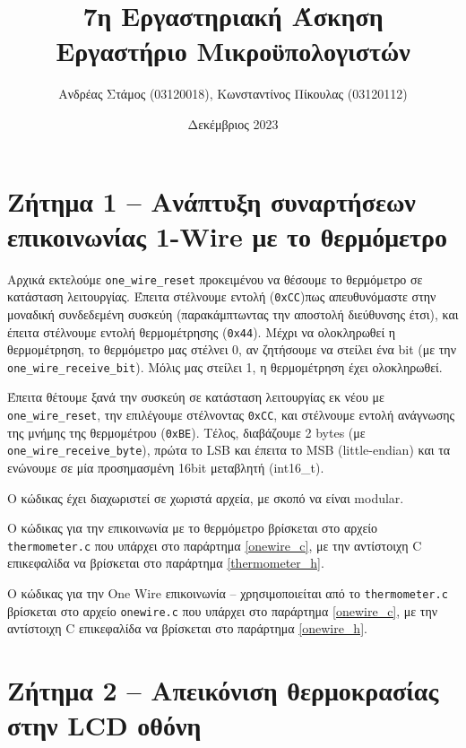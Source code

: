 \documentclass[a4paper]{article}
\title{7η Εργαστηριακή Άσκηση\\Εργαστήριο Μικροϋπολογιστών}
\author{Ανδρέας Στάμος (03120018), Κωνσταντίνος Πίκουλας (03120112)}
\date{Δεκέμβριος 2023}
\begin{document}
\maketitle
\tableofcontents

\section{Ζήτημα 1 -- Ανάπτυξη συναρτήσεων επικοινωνίας 1-Wire με το θερμόμετρο}

\par Αρχικά εκτελούμε \texttt{one\_wire\_reset} προκειμένου να θέσουμε το θερμόμετρο σε κατάσταση λειτουργίας.
Έπειτα στέλνουμε εντολή (\texttt{0xCC})πως απευθυνόμαστε στην μοναδική συνδεδεμένη συσκεύη (παρακάμπτωντας την αποστολή διεύθυνσης έτσι),
και έπειτα στέλνουμε εντολή θερμομέτρησης (\texttt{0x44}). Μέχρι να ολοκληρωθεί η θερμομέτρηση, το θερμόμετρο μας στέλνει 0, αν ζητήσουμε να
στείλει ένα bit (με την \texttt{one\_wire\_receive\_bit}). Μόλις μας στείλει 1, η θερμομέτρηση έχει ολοκληρωθεί.
\par Έπειτα θέτουμε ξανά την συσκεύη σε κατάσταση λειτουργίας εκ νέου με \texttt{one\_wire\_reset}, την επιλέγουμε στέλνοντας \texttt{0xCC}, και στέλνουμε
εντολή ανάγνωσης της μνήμης της θερμομέτρου (\texttt{0xBE}). Τέλος, διαβάζουμε 2 bytes (με \texttt{one\_wire\_receive\_byte}), πρώτα το LSB και έπειτα
το MSB (little-endian) και τα ενώνουμε σε μία προσημασμένη 16bit μεταβλητή (int16\_t).

\par Ο κώδικας έχει διαχωριστεί σε χωριστά αρχεία, με σκοπό να είναι modular.

\par Ο κώδικας για την επικοινωνία με το θερμόμετρο βρίσκεται στο αρχείο \texttt{thermometer.c} που υπάρχει στο παράρτημα \ref{onewire_c},
με την αντίστοιχη C επικεφαλίδα να βρίσκεται στο παράρτημα \ref{thermometer_h}.

\par Ο κώδικας για την One Wire επικοινωνία -- χρησιμοποιείται από το \texttt{thermometer.c}
βρίσκεται στο αρχείο \texttt{onewire.c} που υπάρχει στο παράρτημα \ref{onewire_c},
με την αντίστοιχη C επικεφαλίδα να βρίσκεται στο παράρτημα \ref{onewire_h}.

\section{Ζήτημα 2 -- Απεικόνιση θερμοκρασίας στην LCD οθόνη}
\end{document}
